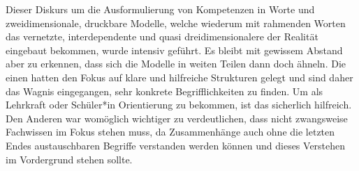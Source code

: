







Dieser Diskurs um die Ausformulierung von Kompetenzen in Worte und zweidimensionale, druckbare Modelle, welche wiederum mit rahmenden Worten das vernetzte, interdependente und quasi dreidimensionalere der Realität eingebaut bekommen, wurde intensiv geführt. Es bleibt mit gewissem Abstand aber zu erkennen, dass sich die Modelle in weiten Teilen dann doch ähneln. 
Die einen \autocite{weißeno.2010} hatten den Fokus auf klare und hilfreiche Strukturen gelegt und sind daher das Wagnis eingegangen, sehr konkrete Begrifflichkeiten zu finden. Um als Lehrkraft oder Schüler*in Orientierung zu bekommen, ist das sicherlich hilfreich. Den Anderen \autocite{Besand.2011} war womöglich wichtiger zu verdeutlichen, dass nicht zwangsweise Fachwissen im Fokus stehen muss, da Zusammenhänge auch ohne die letzten Endes austauschbaren Begriffe verstanden werden können und dieses Verstehen im Vordergrund stehen sollte. 

